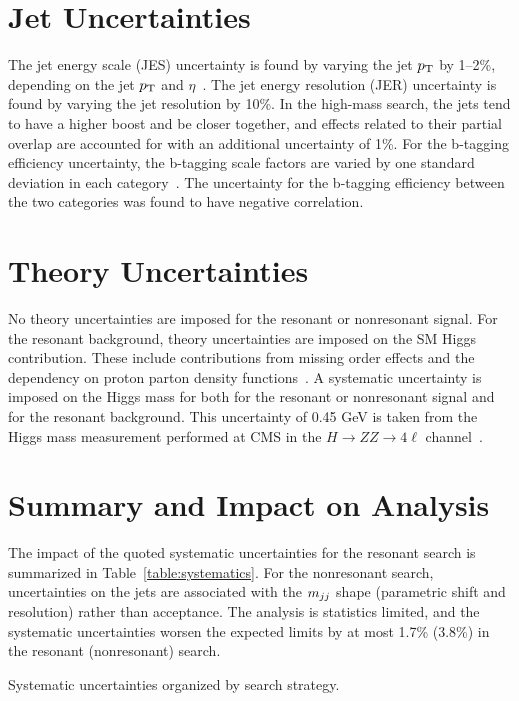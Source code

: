 \section{Jet Uncertainties\label{sec:jetunc}}

The jet energy scale (JES) uncertainty is found by varying the jet $p_{\rm T}$ by 1--2\%,
depending on the jet $p_{\rm T}$ and $\eta$~\cite{JINST6}.
The jet energy resolution (JER) uncertainty is found by varying the jet resolution by 10\%.
In the high-mass search, the jets tend to have a higher boost and be closer together,
and effects related to their partial overlap are accounted for with an additional uncertainty of 1\%.
For the b-tagging efficiency uncertainty, the b-tagging scale factors are varied by one standard
deviation in each category~\cite{BTV}. 
The uncertainty for the b-tagging efficiency between the two categories
was found to have negative correlation.

\section{Theory Uncertainties\label{sec:theoryunc}}

No theory uncertainties are imposed for the resonant or nonresonant signal.
For the resonant background, theory uncertainties are imposed on the SM Higgs contribution. These
include contributions from missing order effects and the dependency on proton parton density
functions~\cite{Dittmaier:2011ti,Heinemeyer:2013tqa}.
A systematic uncertainty is imposed on the Higgs mass for both for the resonant or nonresonant signal
and for the resonant background.
This uncertainty of 0.45 GeV is taken from the Higgs mass measurement performed at CMS in the
$H\rightarrow ZZ \rightarrow 4\ell$ channel~\cite{Chatrchyan:2013mxa}.

\section{Summary and Impact on Analysis\label{sec:uncimpact}}

The impact of the quoted systematic uncertainties for the resonant search is summarized in
Table~\ref{table:systematics}. For the nonresonant search, uncertainties on the jets are
associated with the $m_{jj}$ shape (parametric shift and resolution) rather than acceptance.
The analysis is statistics limited, and the systematic uncertainties worsen the expected limits
by at most 1.7\% (3.8\%) in the resonant (nonresonant) search.

\begin{table}[ht]
  \centering
  \renewcommand{\arraystretch}{1.4}
  \caption{Systematic uncertainties organized by search strategy.}
  
  \label{table:systematics}
\end{table}
